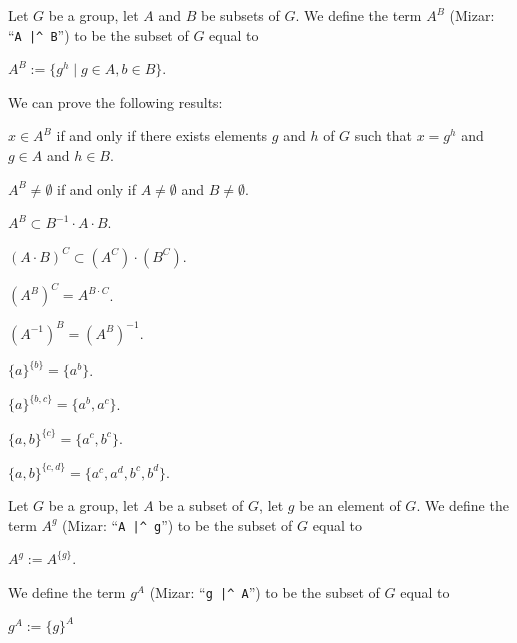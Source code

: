 \documentclass{article}
\begin{document}
\begin{definition}
Let $G$ be a group, let $A$ and $B$ be subsets of $G$.
We define the term $A^{B}$ (Mizar: ``\verb#A |^ B#'') to be the subset
of $G$ equal to
\begin{defn}
\item $A^{B}:=\{g^{h}\mid g\in A,b\in B\}$.
\end{defn}
\end{definition}

We can prove the following results:
\begin{thm}
\item\label{group3:31} $x\in A^{B}$ if and only if there exists elements
  $g$ and $h$ of $G$ such that $x=g^{h}$ and $g\in A$ and $h\in B$.
\item\label{group3:32} $A^{B}\neq\emptyset$ if and only if
  $A\neq\emptyset$ and $B\neq\emptyset$.
\item\label{group3:33} $A^{B}\subset B^{-1}\cdot A\cdot B$.
\item\label{group3:34} $(A\cdot B)^{C}\subset (A^{C})\cdot(B^{C})$.
\item\label{group3:35} $(A^{B})^{C} = A^{B\cdot C}$.
\item\label{group3:36} $(A^{-1})^{B} = (A^{B})^{-1}$.
\item\label{group3:37} $\{a\}^{\{b\}}=\{a^{b}\}$.
\item\label{group3:38} $\{a\}^{\{b,c\}}=\{a^{b},a^{c}\}$.
\item\label{group3:39} $\{a,b\}^{\{c\}}=\{a^{c},b^{c}\}$.
\item\label{group3:40} $\{a,b\}^{\{c,d\}}=\{a^{c},a^{d},b^{c},b^{d}\}$.
\end{thm}

\begin{definition}
Let $G$ be a group, let $A$ be a subset of $G$, let $g$ be an element of
$G$.
We define the term $A^{g}$ (Mizar: ``\verb#A |^ g#'') to be the subset of $G$ equal to
\begin{defn}
\item $A^{g}:=A^{\{g\}}$.
\end{defn}
We define the term $g^{A}$ (Mizar: ``\verb#g |^ A#'') to be the subset of $G$ equal to
\begin{defn}
\item $g^{A}:=\{g\}^{A}$
\end{defn}
\end{definition}
\end{document}
